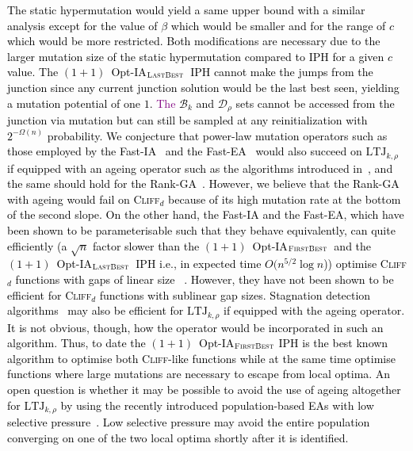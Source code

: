 \documentclass[lettersize,journal]{IEEEtran}
\newcommand{\rerev}[1]{\textcolor{purple}{#1}}
\newcommand{\firstBest}{$(1+1)$~Opt-IA$_{\textsc{FirstBest}}$}
\newcommand{\lastBest}{$(1+1)$~Opt-IA$_{\textsc{LastBest}}$}
\begin{document}
\textcolor{black}{The static hypermutation would yield a same upper bound with a similar analysis except for the value of $\beta$ which would be smaller and for the range of $c$ which would be more restricted. Both modifications are necessary due to the larger mutation size of the static hypermutation compared to IPH for a given $c$ value. The \lastBest~IPH cannot make the jumps from the junction since any current junction solution would be the last best seen, yielding a mutation potential of one $1$. \rerev{The} $\mathcal{B}_k$ and $\mathcal{D}_\rho$ sets cannot be accessed from the junction via mutation but can still be sampled at any reinitialization with $2^{-\Omega(n)}$ probability.}
\textcolor{black}{We conjecture that power-law mutation operators such as those employed by the Fast-IA~\cite{CorusOlivetoYazdani2021TEVC} and the Fast-EA~\cite{DoerrGECCO2017FastGA} would also succeed on $\mathrm{LTJ}_{k,\rho}$ if equipped with an ageing operator such as the algorithms introduced in~\cite{CorusOlivetoYazdani2021TEVC}, and the same should hold for the Rank-GA~\cite{RankBasedMutation}. However, we believe that the Rank-GA with ageing would fail on \textsc{Cliff}$_d$ because of its high mutation rate at the bottom of the second slope. On the other hand, the Fast-IA and the Fast-EA, which have been shown to be parameterisable such that they behave equivalently, can quite efficiently (a $\sqrt{n}$ factor slower than the \firstBest~and the \lastBest~IPH i.e., in expected time $O(n^{5/2} \log n$))  optimise \textsc{Cliff}$_d$ functions with gaps of linear size~\cite{CorusOlivetoYazdani2021TEVC} . However, they have not been shown to be efficient for \textsc{Cliff}$_d$  functions with sublinear gap sizes. 
Stagnation detection algorithms~\cite{KW2024,RW2022,RW2023} may also be efficient for $\mathrm{LTJ}_{k,\rho}$ if equipped with the ageing operator. It is not obvious, though, how the operator would be incorporated in such an algorithm. Thus, to date the \firstBest{} IPH is the best known algorithm to optimise both \textsc{Cliff}-like functions while at the same time optimise functions where large mutations are necessary to escape from local optima. An open question is whether it may be possible to avoid the use of ageing altogether for $\mathrm{LTJ}_{k,\rho}$ by using the recently introduced population-based EAs with low selective pressure~\cite{CorusLissovoiOlivetoWittTELO2021,COZ25}. Low selective pressure may avoid the entire population converging on one of the two local optima shortly after it is identified.} 
 
\end{document}
